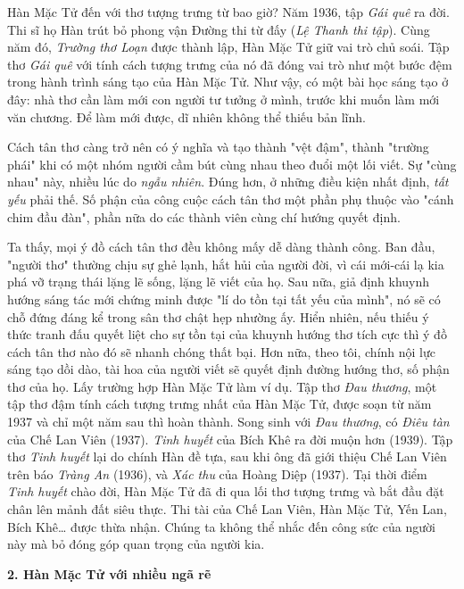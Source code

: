 \documentclass[../main.tex]{subfiles}
\begin{document}
\begin{multicols}{2}
Hàn Mặc Tử đến với thơ tượng trưng từ bao giờ? Năm 1936, tập \textit{Gái quê} ra đời. Thi sĩ họ Hàn trút bỏ phong vận Đường thi từ đấy (\textit{Lệ Thanh thi tập}). Cùng năm đó, \textit{Trường thơ Loạn} được thành lập, Hàn Mặc Tử giữ vai trò chủ soái. Tập thơ \textit{Gái quê} với tính cách tượng trưng của nó đã đóng vai trò như một bước đệm trong hành trình sáng tạo của Hàn Mặc Tử. Như vậy, có một bài học sáng tạo ở đây: nhà thơ cần làm mới con người tư tưởng ở mình, trước khi muốn làm mới văn chương. Để làm mới được, dĩ nhiên không thể thiếu bản lĩnh. 
 
Cách tân thơ càng trở nên có ý nghĩa và tạo thành "vệt đậm", thành "trường phái" khi có một nhóm người cầm bút cùng nhau theo đuổi một lối viết. Sự "cùng nhau" này, nhiều lúc do \textit{ngẫu nhiên}. Đúng hơn, ở những điều kiện nhất định, \textit{tất yếu} phải thế. Số phận của công cuộc cách tân thơ một phần phụ thuộc vào "cánh chim đầu đàn", phần nữa do các thành viên cùng chí hướng quyết định. 
 
Ta thấy, mọi ý đồ cách tân thơ đều không mấy dễ dàng thành công. Ban đầu, "người thơ" thường chịu sự ghẻ lạnh, hắt hủi của người đời, vì cái mới-cái lạ kia phá vỡ trạng thái lặng lẽ sống, lặng lẽ viết của họ. Sau nữa, giả định khuynh hướng sáng tác mới chứng minh được "lí do tồn tại tất yếu của mình", nó sẽ có chỗ đứng đáng kể trong sân thơ chật hẹp nhường ấy. Hiển nhiên, nếu thiếu ý thức tranh đấu quyết liệt cho sự tồn tại của khuynh hướng thơ tích cực thì ý đồ cách tân thơ nào đó sẽ nhanh chóng thất bại. Hơn nữa, theo tôi, chính nội lực sáng tạo dồi dào, tài hoa của người viết sẽ quyết định đường hướng thơ, số phận thơ của họ. Lấy trường hợp Hàn Mặc Tử làm ví dụ. Tập thơ \textit{Đau thương}, một tập thơ đậm tính cách tượng trưng nhất của Hàn Mặc Tử, được soạn từ năm 1937 và chỉ một năm sau thì hoàn thành. Song sinh với \textit{Đau thương}, có \textit{Điêu tàn} của Chế Lan Viên (1937). \textit{Tinh huyết} của Bích Khê ra đời muộn hơn (1939). Tập thơ \textit{Tinh huyết} lại do chính Hàn đề tựa, sau khi  ông đã giới thiệu Chế Lan Viên trên báo \textit{Tràng An} (1936), và \textit{Xác thu} của Hoàng Diệp (1937). Tại thời điểm \textit{Tinh huyết} chào đời, Hàn Mặc Tử đã đi qua lối thơ tượng trưng và bắt đầu đặt chân lên mảnh đất siêu thực. Thi tài của Chế Lan Viên, Hàn Mặc Tử, Yến Lan, Bích Khê… được thừa nhận. Chúng ta không thể nhắc đến công sức của người này mà bỏ đóng góp quan trọng của người kia. 
       
     
\textbf{2. Hàn Mặc Tử với nhiều ngã rẽ} 
 

\end{multicols}
\end{document}

